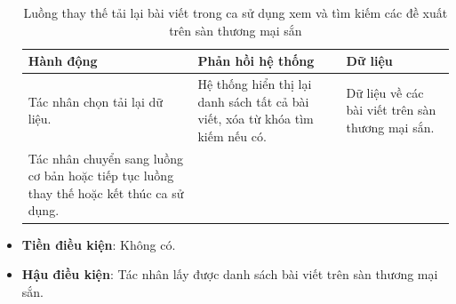 \documentclass[./../main.tex]{subfiles}
\begin{document}
\begin{itemize}
        \begin{table}[H]
        \caption{\label{uc-31}Luồng thay thế tải lại bài viết trong ca sử dụng xem và tìm kiếm các đề xuất trên sàn thương mại sắn}
        \begin{tabularx}{\textwidth}{| X | X | X |}
            \hline
            \textbf{Hành động} & \textbf{Phản hồi hệ thống} & \textbf{Dữ liệu} \\ \hline
            Tác nhân chọn tải lại dữ liệu. & Hệ thống hiển thị lại danh sách tất cả bài viết, xóa từ khóa tìm kiếm nếu có. & Dữ liệu về các bài viết trên sàn thương mại sắn. 
            \\ \hline
            Tác nhân chuyển sang luồng cơ bản hoặc tiếp tục luồng thay thế hoặc kết thúc ca sử dụng. &  &
            \\ \hline
        \end{tabularx}
        \end{table}
    \item \textbf{Tiền điều kiện}: Không có.
    \item \textbf{Hậu điều kiện}: Tác nhân lấy được danh sách bài viết trên sàn thương mại sắn.
\end{itemize}
\end{document}
